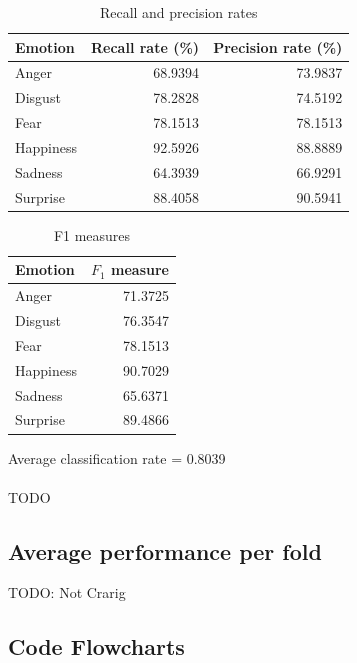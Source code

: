 \documentclass[12pt]{article}
\begin{document}
\begin{table}
\centering
\begin{tabular}{l | r r}
Emotion & Recall rate (\%) & Precision rate (\%) \\
\hline
Anger     & 68.9394 & 73.9837 \\
Disgust   & 78.2828 & 74.5192 \\
Fear      & 78.1513 & 78.1513 \\
Happiness & 92.5926 & 88.8889 \\
Sadness   & 64.3939 & 66.9291 \\
Surprise  & 88.4058 & 90.5941 \\
\end{tabular}
\caption{Recall and precision rates}
\end{table}

\begin{table}
\centering
\begin{tabular}{l | r}
Emotion & \( F_1 \) measure \\
\hline
Anger     & 71.3725 \\
Disgust   & 76.3547 \\
Fear      & 78.1513 \\
Happiness & 90.7029 \\
Sadness   & 65.6371 \\
Surprise  & 89.4866 \\
\end{tabular}
\caption{F1 measures}
\end{table}

Average classification rate = 0.8039 \\ \\

TODO


\subsection*{Average performance per fold}

TODO: Not Crarig

\newpage
\subsection*{Code Flowcharts}
\end{document}
